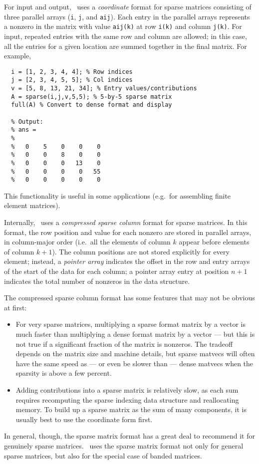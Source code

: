 \documentclass[12pt, leqno]{article} %
\begin{document}
For input and output, \matlab\ uses a {\em coordinate} format for
sparse matrices consisting of three parallel arrays ({\tt i}, {\tt j},
and {\tt aij}).  Each entry in the parallel arrays represents a
nonzero in the matrix with value {\tt aij(k)} at row {\tt i(k)} and
column {\tt j(k)}.  For input, repeated entries with the same row and
column are allowed; in this case, all the entries for a given location
are summed together in the final matrix.  For example,
\begin{lstlisting}
  i = [1, 2, 3, 4, 4]; % Row indices
  j = [2, 3, 4, 5, 5]; % Col indices
  v = [5, 8, 13, 21, 34]; % Entry values/contributions
  A = sparse(i,j,v,5,5); % 5-by-5 sparse matrix
  full(A) % Convert to dense format and display

  % Output:
  % ans =
  %
  %   0    5    0    0    0
  %   0    0    8    0    0
  %   0    0    0   13    0
  %   0    0    0    0   55
  %   0    0    0    0    0
\end{lstlisting}
This functionality is useful
in some applications (e.g.~for assembling finite element matrices).

Internally, \matlab\ uses a {\em compressed sparse column} format
for sparse matrices.  In this format, the row position and value for
each nonzero are stored in parallel arrays, in column-major
order (i.e.~all the elements of column $k$ appear before elements of
column $k+1$).  The column positions are not stored explicitly for
every element; instead, a {\em pointer array} indicates the offset
in the row and entry arrays of the start of the data for each column;
a pointer array entry at position $n+1$ indicates the total number
of nonzeros in the data structure.

The compressed sparse column format has some features that may not
be obvious at first:
\begin{itemize}
\item
  For very sparse matrices, multiplying a sparse format matrix by a
  vector is much faster than multiplying a dense format matrix by a
  vector --- but this is not true if a significant fraction of the
  matrix is nonzeros.  The tradeoff depends on the matrix size and
  machine details, but sparse matvecs will often have the same speed as ---
  or even be slower than --- dense matvecs when the sparsity is above a
  few percent.
\item
  Adding contributions into a sparse matrix is relatively slow,
  as each sum requires recomputing the sparse indexing data structure
  and reallocating memory.  To build up a sparse matrix as the sum of
  many components, it is usually best to use the coordinate form first.
\end{itemize}
In general, though, the sparse matrix format has a great deal to
recommend it for genuinely sparse matrices.  \matlab\ uses the sparse
matrix format not only for general sparse matrices, but also for the
special case of banded matrices.
\end{document}
